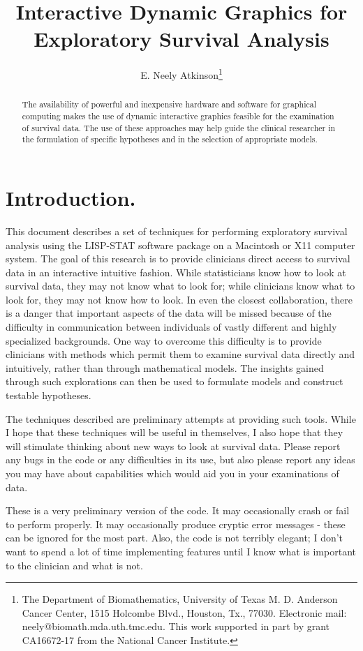 \documentclass[11pt]{article}
\title{Interactive Dynamic Graphics for Exploratory Survival Analysis}
\author{E. Neely Atkinson\thanks{
The Department of Biomathematics, University of Texas M. D. Anderson Cancer
Center, 1515 Holcombe Blvd., Houston, Tx., 77030. Electronic mail: 
neely@biomath.mda.uth.tmc.edu.
This work supported in part by grant CA16672-17 
from the National Cancer Institute.}}
\begin{document}
\maketitle
\begin{abstract}
The availability of powerful and inexpensive hardware and software for
graphical computing makes 
the use of dynamic interactive graphics feasible for the examination of 
survival data. The use of these approaches may help guide the clinical 
researcher in the formulation of specific hypotheses and in the selection 
of appropriate models.
\end{abstract}
\section{Introduction.}
This document describes a set of techniques for performing exploratory survival analysis
using the LISP-STAT software package on a Macintosh or X11 computer system.
The goal of this research is to provide
clinicians direct access to survival data in an interactive intuitive fashion. 
While statisticians know how to look at survival data, they may not know what to
look for; while clinicians know what to look for, they may not know how to look.
In even the closest collaboration, there is a danger that important aspects of the
data will be missed because of the difficulty in communication between individuals
of vastly different and highly specialized backgrounds.
One way to overcome this difficulty is to provide clinicians with methods which
permit them to examine survival data directly and intuitively, rather than through
mathematical models. The insights gained through such explorations can then be used
to formulate models and construct testable hypotheses.

The techniques described are preliminary attempts at providing such tools. While
I hope that these techniques will be useful in themselves, I also hope that they
will stimulate thinking about new ways to look at survival data. Please report
any bugs in the code or any difficulties in its use, but also please report any ideas
you may have about capabilities which would aid you in your examinations of data.

These is a very preliminary version of the code. It may occasionally crash or fail
to perform properly. It may occasionally produce cryptic error messages - these
can be ignored for the most part. Also, the code is not terribly elegant; I don't want
to spend a lot of time implementing features until I know what is important to 
the clinician and what is not.
\end{document}
